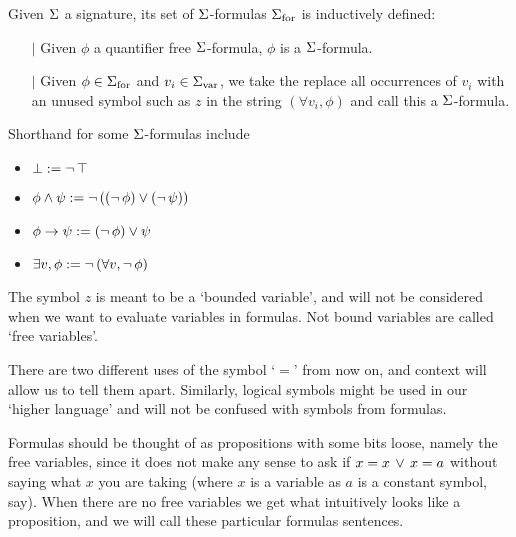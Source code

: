 \begin{dfn}
    Given $\Sigma$ a signature, 
    its set of $\Sigma$-formulas ${\Sigma}_\mathrm{for}$ is inductively defined:
    \begin{itemize}
        \item[$\vert$] Given $\phi$ a quantifier free $\Sigma$-formula,
        $\phi$ is a $\Sigma$-formula.
        \item[$\vert$] Given $\phi \in {\Sigma}_\mathrm{for}$ 
        and $v_i \in {\Sigma}_\mathrm{var}$, we take the replace all occurrences of
        $v_i$ with an unused symbol such as 
        $z$ in the string $(\forall v_i, \phi)$
        and call this a $\Sigma$-formula.
    \end{itemize}
    Shorthand for some $\Sigma$-formulas include 
    \begin{itemize}
        \item $\bot := \neg\, \top$
        \item $\phi \land \psi := \neg\,((\neg\,\phi) \lor (\neg\,\psi))$
        \item $\phi \to \psi := (\neg\,\phi) \lor \psi$
        \item $\exists v, \phi := \neg\,(\forall v, \neg\,\phi)$
    \end{itemize}
    
    The symbol $z$ is meant to be a `bounded variable', 
    and will not be considered when we want to evaluate
    variables in formulas.
    Not bound variables are called `free variables'.
\end{dfn}
\begin{rmk}
    There are two different uses of the symbol `$=$' from now on, 
    and context will allow us to tell them apart.
    Similarly, logical symbols might be used in our `higher language' 
    and will not be confused with symbols from formulas.

    Formulas should be thought of as propositions with some bits loose, 
    namely the free variables, since it does not make any sense to ask if 
    $x = x \, \lor \, x = a$ without saying what $x$ you are taking
    (where $x$ is a variable as $a$ is a constant symbol, say).
    When there are no free variables we get what intuitively looks like a 
    proposition, and we will call these particular formulas sentences.
\end{rmk}

